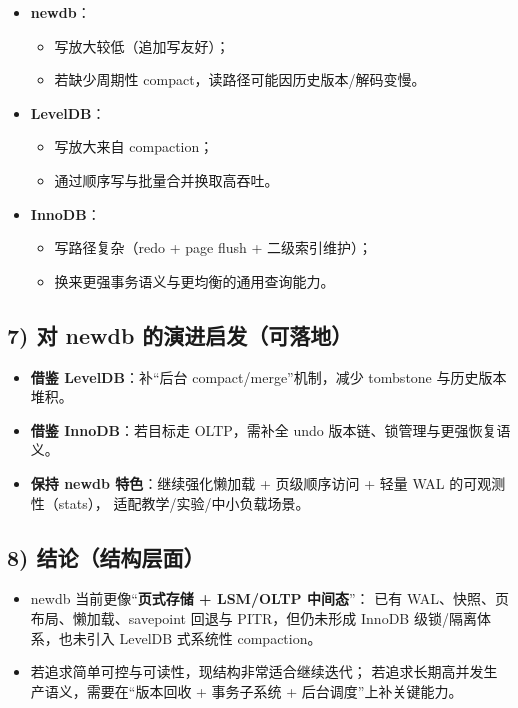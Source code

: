 \begin{itemize}
  \item \textbf{newdb}：
    \begin{itemize}
      \item 写放大较低（追加写友好）；
      \item 若缺少周期性 compact，读路径可能因历史版本/解码变慢。
    \end{itemize}
  \item \textbf{LevelDB}：
    \begin{itemize}
      \item 写放大来自 compaction；
      \item 通过顺序写与批量合并换取高吞吐。
    \end{itemize}
  \item \textbf{InnoDB}：
    \begin{itemize}
      \item 写路径复杂（redo + page flush + 二级索引维护）；
      \item 换来更强事务语义与更均衡的通用查询能力。
    \end{itemize}
\end{itemize}

\subsection{7) 对 newdb 的演进启发（可落地）}

\begin{itemize}
  \item \textbf{借鉴 LevelDB}：补“后台 compact/merge”机制，减少 tombstone 与历史版本堆积。
  \item \textbf{借鉴 InnoDB}：若目标走 OLTP，需补全 undo 版本链、锁管理与更强恢复语义。
  \item \textbf{保持 newdb 特色}：继续强化懒加载 + 页级顺序访问 + 轻量 WAL 的可观测性（stats），
    适配教学/实验/中小负载场景。
\end{itemize}

\subsection{8) 结论（结构层面）}

\begin{itemize}
  \item newdb 当前更像“\textbf{页式存储 + LSM/OLTP 中间态}”：
    已有 WAL、快照、页布局、懒加载、savepoint 回退与 PITR，但仍未形成 InnoDB 级锁/隔离体系，也未引入 LevelDB 式系统性 compaction。
  \item 若追求简单可控与可读性，现结构非常适合继续迭代；
    若追求长期高并发生产语义，需要在“版本回收 + 事务子系统 + 后台调度”上补关键能力。
\end{itemize}

